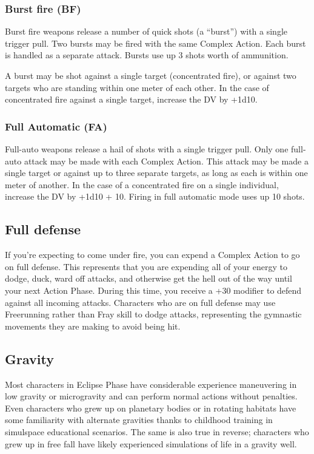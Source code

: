 \subsubsection{Burst fire (BF)}

Burst fire weapons release a number of quick shots (a ``burst”) with a single trigger pull. Two bursts may be fired with the same Complex Action. Each burst is handled as a separate attack. Bursts use up 3 shots worth of ammunition.

A burst may be shot against a single target (concentrated fire), or against two targets who are standing within one meter of each other. In the case of concentrated fire against a single target, increase the DV by +1d10.

\subsubsection{Full Automatic (FA)}

Full-auto weapons release a hail of shots with a single trigger pull. Only one full-auto attack may be made with each Complex Action. This attack may be made a single target or against up to three separate targets, as long as each is within one meter of another. In the case of a concentrated fire on a single individual, increase the DV by +1d10 + 10. Firing in full automatic mode uses up 10 shots.


\subsection{Full defense}
\label{sec:full-defense}

If you’re expecting to come under fire, you can expend a Complex Action to go on full defense. This represents that you are expending all of your energy to dodge, duck, ward off attacks, and otherwise get the hell out of the way until your next Action Phase. During this time, you receive a +30 modifier to defend against all incoming attacks. Characters who are on full defense may use Freerunning rather than Fray skill to dodge attacks, representing the gymnastic movements they are making to avoid being hit.

\subsection{Gravity}
\label{sec:gravity}

Most characters in Eclipse Phase have considerable experience maneuvering in low gravity or microgravity and can perform normal actions without penalties. Even characters who grew up on planetary bodies or in rotating habitats have some familiarity with alternate gravities thanks to childhood training in simulspace educational scenarios. The same is also true in reverse; characters who grew up in free fall have likely experienced simulations of life in a gravity well.


